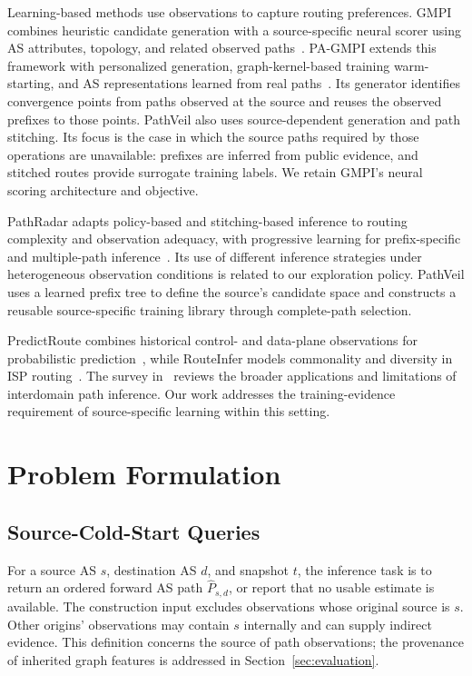 \documentclass[conference]{IEEEtran}
\newcommand{\sys}{\mbox{PathVeil}\xspace}
\begin{document}
Learning-based methods use observations to capture routing preferences.
GMPI combines heuristic candidate generation with a source-specific
neural scorer using AS attributes, topology, and related observed
paths~\cite{li2023realizing}. PA-GMPI extends this framework with
personalized generation, graph-kernel-based training warm-starting,
and AS representations learned from real paths~\cite{li2024realizing}.
Its generator identifies convergence points from paths observed at the
source and reuses the observed prefixes to those points. \sys also
uses source-dependent generation and path stitching. Its focus is the
case in which the source paths required by those operations are
unavailable: prefixes are inferred from public evidence, and stitched
routes provide surrogate training labels. We retain GMPI's neural
scoring architecture and objective.

PathRadar adapts policy-based and stitching-based inference to routing
complexity and observation adequacy, with progressive learning for
prefix-specific and multiple-path inference~\cite{pathradar2025}. Its use
of different inference strategies under heterogeneous observation
conditions is related to our exploration policy. \sys uses a learned
prefix tree to define the source's candidate space and constructs a
reusable source-specific training library through complete-path
selection.

PredictRoute combines historical control- and data-plane observations
for probabilistic prediction~\cite{singh2021predictroute}, while
RouteInfer models commonality and diversity in ISP
routing~\cite{wang2022routeinfer}. The survey
in~\cite{li2024internet} reviews the broader applications and limitations
of interdomain path inference. Our work addresses the training-evidence
requirement of source-specific learning within this setting.

\section{Problem Formulation}
\label{sec:problem}

\subsection{Source-Cold-Start Queries}

For a source AS $s$, destination AS $d$, and snapshot $t$, the inference
task is to return an ordered forward AS path $\widehat P_{s,d}$, or
report that no usable estimate is available. The construction input
excludes observations whose original source is $s$. Other origins'
observations may contain $s$ internally and can supply indirect
evidence. This definition concerns the source of path observations;
the provenance of inherited graph features is addressed in
Section~\ref{sec:evaluation}.
\end{document}
